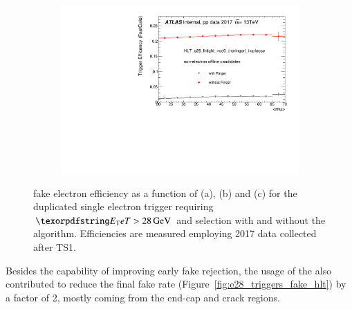 \begin{figure}[h!tb]
\begin{center}
  \begin{subfigure}[c]{.48\textwidth}
  \centering
  \includegraphics[width=\textwidth]{sections/operation/figures/efficiencies/eff_EGAM7_e28_ringer_and_noringer_2017_after_ts1_L2Calo_mu.pdf}
  \caption{}
  \end{subfigure}
  \caption{\label{fig:e28_triggers_fake} \fastcalo %
  fake electron efficiency as a function of \et (a), \eta (b) and \avgmu (c) for the
  duplicated single electron trigger requiring $\et > \SI{28}{\GeV}$ and \tight
  selection with and without the \rnn{} algorithm. Efficiencies are measured
  employing 2017 data collected after TS1.}%
  
  \end{center}
\end{figure}





Besides the capability of improving early fake rejection, the usage of the
\rnn{} also contributed to reduce the final fake rate
(Figure~\ref{fig:e28_triggers_fake_hlt}) by a factor of 2, mostly coming from
the end-cap and crack regions. %


